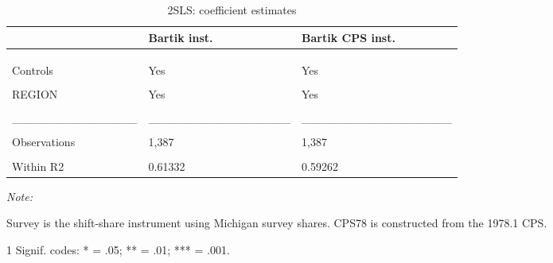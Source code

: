\begin{table}
\centering
\caption{\label{tab:table:2sls:stage2:noloo}2SLS: coefficient estimates}
\centering
\begin{threeparttable}
\begin{tabular}[t]{lll}
\toprule
 & Bartik inst. & Bartik CPS inst.\\
\midrule
\cellcolor{gray!10}{Dependent Var.:} & \cellcolor{gray!10}{RegInf} & \cellcolor{gray!10}{RegInf}\\
\addlinespace
 &  & \\
\addlinespace
\cellcolor{gray!10}{pe} & \cellcolor{gray!10}{0.1304** (0.0446)} & \cellcolor{gray!10}{0.2318*** (0.0617)}\\
\addlinespace
Controls & Yes & Yes\\
\addlinespace
\cellcolor{gray!10}{Fixed-Effects:} & \cellcolor{gray!10}{-----------------} & \cellcolor{gray!10}{------------------}\\
\addlinespace
REGION & Yes & Yes\\
\addlinespace
\cellcolor{gray!10}{TIME} & \cellcolor{gray!10}{Yes} & \cellcolor{gray!10}{Yes}\\
\addlinespace
\_\_\_\_\_\_\_\_\_\_\_\_\_\_\_ & \_\_\_\_\_\_\_\_\_\_\_\_\_\_\_\_\_ & \_\_\_\_\_\_\_\_\_\_\_\_\_\_\_\_\_\_\\
\addlinespace
\cellcolor{gray!10}{S.E. type} & \cellcolor{gray!10}{Drisc.-Kra. (L=4)} & \cellcolor{gray!10}{Drisco.-Kra. (L=4)}\\
\addlinespace
Observations & 1,387 & 1,387\\
\addlinespace
\cellcolor{gray!10}{R2} & \cellcolor{gray!10}{0.96008} & \cellcolor{gray!10}{0.95795}\\
\addlinespace
Within R2 & 0.61332 & 0.59262\\
\bottomrule
\end{tabular}
\begin{tablenotes}
\item \textit{Note: } 
\item Survey is the shift-share instrument using Michigan survey shares. CPS78 is constructed from the 1978.1 CPS.
\item[1] Signif. codes: * = .05; ** = .01; *** = .001.
\end{tablenotes}
\end{threeparttable}
\end{table}
